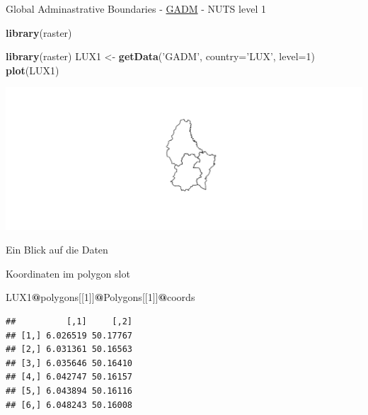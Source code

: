 \documentclass[ignorenonframetext,]{beamer}
\newenvironment{Shaded}{\begin{snugshade}}{\end{snugshade}}
\newcommand{\KeywordTok}[1]{\textcolor[rgb]{0.13,0.29,0.53}{\textbf{#1}}}
\newcommand{\DataTypeTok}[1]{\textcolor[rgb]{0.13,0.29,0.53}{#1}}
\newcommand{\DecValTok}[1]{\textcolor[rgb]{0.00,0.00,0.81}{#1}}
\newcommand{\StringTok}[1]{\textcolor[rgb]{0.31,0.60,0.02}{#1}}
\newcommand{\OperatorTok}[1]{\textcolor[rgb]{0.81,0.36,0.00}{\textbf{#1}}}
\newcommand{\NormalTok}[1]{#1}
\begin{document}
\begin{frame}[fragile]{Global Adminastrative Boundaries -
\href{http://www.gadm.org/}{GADM} - NUTS level 1}

\begin{Shaded}
\begin{Highlighting}[]
\KeywordTok{library}\NormalTok{(raster)}
\end{Highlighting}
\end{Shaded}

\begin{Shaded}
\begin{Highlighting}[]
\KeywordTok{library}\NormalTok{(raster)}
\NormalTok{LUX1 <-}\StringTok{ }\KeywordTok{getData}\NormalTok{(}\StringTok{'GADM'}\NormalTok{, }\DataTypeTok{country=}\StringTok{'LUX'}\NormalTok{, }\DataTypeTok{level=}\DecValTok{1}\NormalTok{)}
\KeywordTok{plot}\NormalTok{(LUX1)}
\end{Highlighting}
\end{Shaded}

\includegraphics{Shapefiles_files/figure-beamer/unnamed-chunk-19-1.pdf}

\end{frame}

\begin{frame}[fragile]{Ein Blick auf die Daten}

Koordinaten im polygon slot

\begin{Shaded}
\begin{Highlighting}[]
\NormalTok{LUX1}\OperatorTok{@}\NormalTok{polygons[[}\DecValTok{1}\NormalTok{]]}\OperatorTok{@}\NormalTok{Polygons[[}\DecValTok{1}\NormalTok{]]}\OperatorTok{@}\NormalTok{coords}
\end{Highlighting}
\end{Shaded}

\begin{verbatim}
##          [,1]     [,2]
## [1,] 6.026519 50.17767
## [2,] 6.031361 50.16563
## [3,] 6.035646 50.16410
## [4,] 6.042747 50.16157
## [5,] 6.043894 50.16116
## [6,] 6.048243 50.16008
\end{verbatim}

\end{frame}
\end{document}
